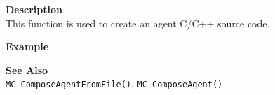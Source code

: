 \noindent
{\bf Description}\\
This function is used to create an agent C/C++ source code. 

\noindent
{\bf Example}\\
\noindent
{\footnotesize}

\noindent
{\bf See Also}\\
\texttt{MC\_ComposeAgentFromFile()}, \texttt{MC\_ComposeAgent()}

